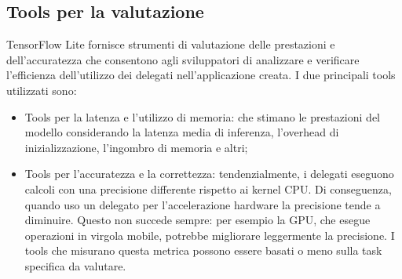 \subsection{Tools per la valutazione}
TensorFlow Lite fornisce strumenti di valutazione delle prestazioni e dell’accuratezza che consentono agli sviluppatori di analizzare e verificare
l’efficienza dell’utilizzo dei delegati nell’applicazione creata. I due principali tools utilizzati sono:
\begin{itemize}
    \item Tools per la latenza e l’utilizzo di memoria: che stimano le prestazioni del modello considerando la latenza media di inferenza,
    l’overhead di inizializzazione, l’ingombro di memoria e altri;
    \item Tools per l’accuratezza e la correttezza: tendenzialmente, i delegati eseguono calcoli con una precisione differente rispetto ai kernel CPU.
    Di conseguenza, quando uso un delegato per l’accelerazione hardware la precisione tende a diminuire. Questo non succede sempre: per esempio la GPU,
    che esegue operazioni in virgola mobile, potrebbe migliorare leggermente la precisione. I tools che misurano questa metrica possono essere basati o
    meno sulla task specifica da valutare.
\end{itemize}